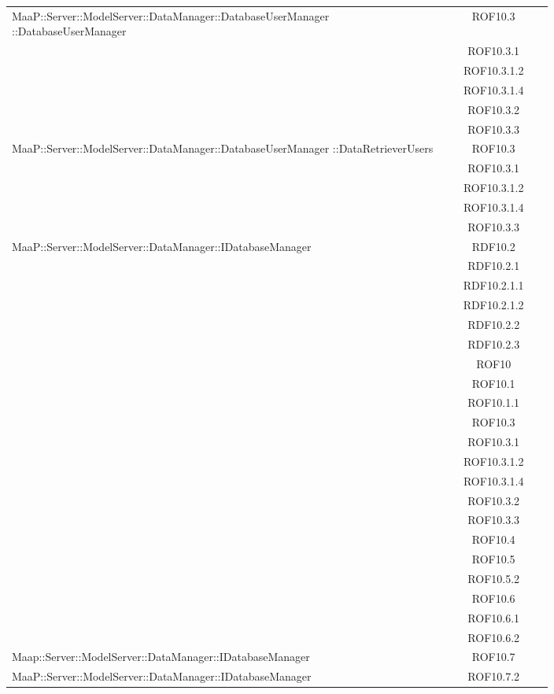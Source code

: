 \begin{center}
\begin{longtable}{|p{0.8\linewidth}|c|}
\midrule
MaaP::Server::ModelServer::DataManager::DatabaseUserManager ::DatabaseUserManager
& ROF10.3\\
& ROF10.3.1\\
& ROF10.3.1.2\\
& ROF10.3.1.4\\
& ROF10.3.2\\
& ROF10.3.3\\

\midrule
MaaP::Server::ModelServer::DataManager::DatabaseUserManager ::DataRetrieverUsers
& ROF10.3\\
& ROF10.3.1\\
& ROF10.3.1.2\\
& ROF10.3.1.4\\
& ROF10.3.3\\

\midrule
MaaP::Server::ModelServer::DataManager::IDatabaseManager
& RDF10.2\\
& RDF10.2.1\\
& RDF10.2.1.1\\
& RDF10.2.1.2\\
& RDF10.2.2\\
& RDF10.2.3\\
& ROF10\\
& ROF10.1\\
& ROF10.1.1\\
& ROF10.3\\
& ROF10.3.1\\
& ROF10.3.1.2\\
& ROF10.3.1.4\\
& ROF10.3.2\\
& ROF10.3.3\\
& ROF10.4\\
& ROF10.5\\
& ROF10.5.2\\
& ROF10.6\\
& ROF10.6.1\\
& ROF10.6.2\\

\midrule
Maap::Server::ModelServer::DataManager::IDatabaseManager
& ROF10.7\\

\midrule
MaaP::Server::ModelServer::DataManager::IDatabaseManager
& ROF10.7.2\\


\end{longtable}
\end{center}

